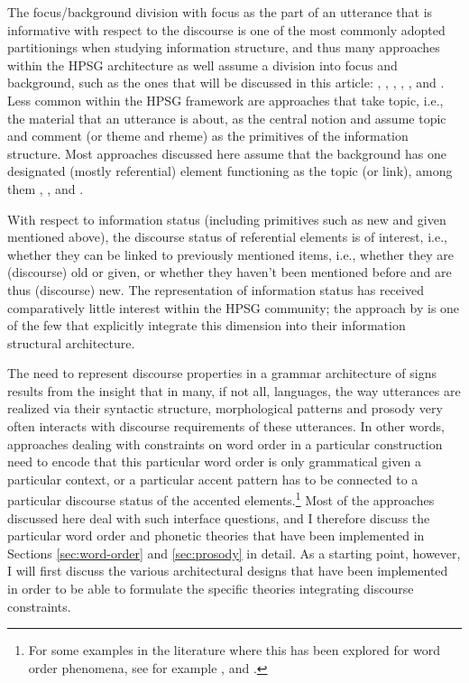 \documentclass[output=paper]{langsci/langscibook}
\begin{document}
The focus/background division with focus as the part of an utterance
that is informative with respect to the discourse is one of the most
commonly adopted partitionings when studying information structure, and
thus many approaches within the HPSG architecture as well assume a
division into focus and background, such as the ones that will be
discussed in this article: \cite{EV96a}, \cite{deKuthy2002a},
\cite{Webelhuth2007a-u}, \cite{Paggio2009a-u}, \cite{Bildhauer2008a},
\cite{song-bender:2012} and \cite{song2018}. Less common within the
HPSG framework are approaches that take topic, i.e., the material that
an utterance is about, as the central notion and assume topic and
comment (or theme and rheme) as the primitives of the information
structure. Most approaches discussed here assume that the background
has one designated (mostly referential) element functioning as the
topic (or link), among them \cite{EV96a}, \cite{deKuthy2002a},
\cite{Paggio2009a-u} and \cite{song2018}.

With respect to information status (including primitives such as new and
given mentioned above), the discourse status of referential elements is of
interest, i.e., whether they can be linked to previously mentioned
items, i.e., whether they are (discourse) old or given, or whether they
haven't been mentioned before and are thus (discourse) new. The
representation of information status has received comparatively little
interest within the HPSG community; the approach by
\cite{DeKuthy.Meurers-11} is one of the few that
explicitly integrate this dimension into their information structural
architecture.

The need to represent discourse properties in a grammar architecture
of signs results from the insight that in many, if not all, languages,
the way utterances are realized via their syntactic structure,
morphological patterns and prosody very often interacts with discourse
requirements of these utterances. In other words, approaches dealing
with constraints on word order in a particular construction need to
encode that this particular word order is only grammatical given a
particular context, or a particular accent pattern has to be connected
to a particular discourse status of the accented elements.\footnote{For some examples in the literature where this has been explored for word order phenomena, see for example \citet{ambridge.goldberg-08}, \citet{DeKuthy.Konietzko-19} and \citet{Culicover.Winkler-19}. }
Most of the approaches discussed here deal with such interface
questions, and I therefore discuss the particular word order and
phonetic theories that have been implemented in Sections \ref{sec:word-order}
and \ref{sec:prosody} in detail. As a starting point, however, I will first
discuss the various architectural designs that have been implemented in
order to be able to formulate the specific theories integrating
discourse constraints.
\end{document}
